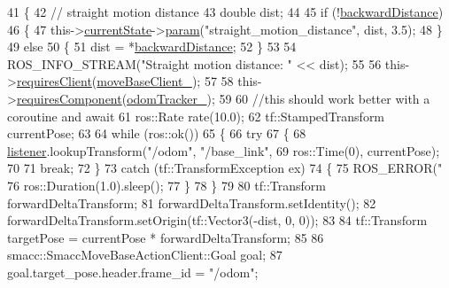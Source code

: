 \begin{DoxyCode}
41     \{
42         \textcolor{comment}{// straight motion distance}
43         \textcolor{keywordtype}{double} dist;
44 
45         \textcolor{keywordflow}{if} (!\hyperlink{classsm__dance__bot_1_1CbNavigateBackwards_ad5b1a7d85676aefa31f966baf61b6378}{backwardDistance})
46         \{
47             this->\hyperlink{classsmacc_1_1SmaccClientBehavior_af76fc9b877542ed5caf033f820c107d0}{currentState}->\hyperlink{classsmacc_1_1ISmaccState_a4982f2187ed6da337462721146e8ef70}{param}(\textcolor{stringliteral}{"straight\_motion\_distance"}, dist, 3.5);
48         \}
49         \textcolor{keywordflow}{else}
50         \{
51             dist = *\hyperlink{classsm__dance__bot_1_1CbNavigateBackwards_ad5b1a7d85676aefa31f966baf61b6378}{backwardDistance};
52         \}
53 
54         ROS\_INFO\_STREAM(\textcolor{stringliteral}{"Straight motion distance: "} << dist);
55 
56         this->\hyperlink{classsmacc_1_1SmaccClientBehavior_adc21bbd45d36bd81ca6f778ed161807a}{requiresClient}(\hyperlink{classsm__dance__bot_1_1CbNavigateBackwards_afd9d7176c5bcc58368ecc08274cf2e01}{moveBaseClient\_});
57 
58         this->\hyperlink{classsmacc_1_1SmaccClientBehavior_a011246bb1424f8bf8c9322f652db9d88}{requiresComponent}(\hyperlink{classsm__dance__bot_1_1CbNavigateBackwards_a2fd4de5f0f4f7bf374d8bfbfd87c6bf2}{odomTracker\_});
59 
60         \textcolor{comment}{//this should work better with a coroutine and await}
61         ros::Rate rate(10.0);
62         tf::StampedTransform currentPose;
63 
64         \textcolor{keywordflow}{while} (ros::ok())
65         \{
66             \textcolor{keywordflow}{try}
67             \{
68                 \hyperlink{classsm__dance__bot_1_1CbNavigateBackwards_a4ec9af0d5b94c5e0654a768c36bec85b}{listener}.lookupTransform(\textcolor{stringliteral}{"/odom"}, \textcolor{stringliteral}{"/base\_link"},
69                                          ros::Time(0), currentPose);
70 
71                 \textcolor{keywordflow}{break};
72             \}
73             \textcolor{keywordflow}{catch} (tf::TransformException ex)
74             \{
75                 ROS\_ERROR(\textcolor{stringliteral}{"%
76                 ros::Duration(1.0).sleep();
77             \}
78         \}
79 
80         tf::Transform forwardDeltaTransform;
81         forwardDeltaTransform.setIdentity();
82         forwardDeltaTransform.setOrigin(tf::Vector3(-dist, 0, 0));
83 
84         tf::Transform targetPose = currentPose * forwardDeltaTransform;
85 
86         smacc::SmaccMoveBaseActionClient::Goal goal;
87         goal.target\_pose.header.frame\_id = \textcolor{stringliteral}{"/odom"};
}
\end{DoxyCode}
